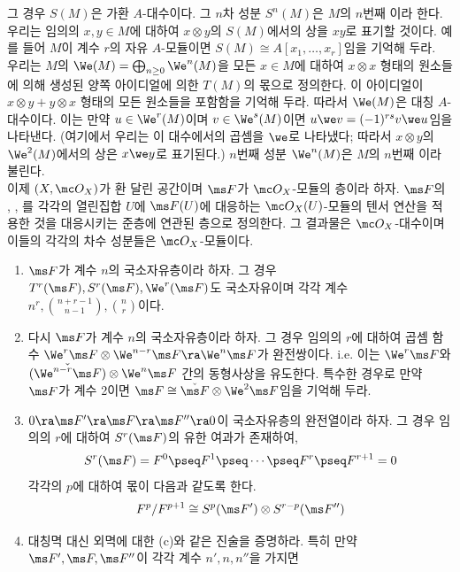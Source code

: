 \begin{enumerate}[label=\tb{5.\arabic*.},itemindent=0mm,itemsep=2mm]
	그 경우 $S(M)$은 가환 $A$-대수이다.
	그 $n$차 성분 $S^n(M)$은 $M$의 $n$번째 이라 한다.
	우리는 임의의 $x,y\in M$에 대하여 $x\otimes y$의 $S(M)$에서의 상을 $xy$로 표기할 것이다.
	예를 들어 $M$이 계수 $r$의 자유 $A$-모듈이면 $S(M)\cong A[x_1,\ldots,x_r]$임을 기억해 두라.\\
	우리는 $M$의  $\We(M)=\bigoplus_{n\ge 0}\We^n(M)$을
	모든 $x\in M$에 대하여 $x\otimes x$ 형태의 원소들에 의해 생성된 양쪽 아이디얼에 의한 $T(M)$의 몫으로 정의한다.
	이 아이디얼이 $x\otimes y+y\otimes x$ 형태의 모든 원소들을 포함함을 기억해 두라.
	따라서 $\We(M)$은  대칭 $A$-대수이다.
	이는 만약 $u\in\We^r(M)$이며 $v\in\We^s(M)$이면 $u\we v=(-1)^{rs}v\we u$임을 나타낸다.
	(여기에서 우리는 이 대수에서의 곱셈을 $\we$로 나타냈다; 따라서 $x\otimes y$의 $\We^2(M)$에서의 상은 $x\we y$로 표기된다.)
	$n$번째 성분 $\We^n(M)$은 $M$의 $n$번째 이라 불린다.\\
	이제 $(X,\mc O_X)$가 환 달린 공간이며 $\ms F$가 $\mc O_X$-모듈의 층이라 하자.
	$\ms F$의 , , 를
	각각의 열린집합 $U$에 $\ms F(U)$에 대응하는 $\mc O_X(U)$-모듈의 텐서 연산을 적용한 것을 대응시키는 준층에 연관된 층으로 정의한다.
	그 결과물은 $\mc O_X$-대수이며 이들의 각각의 차수 성분들은 $\mc O_X$-모듈이다.\\
	\begin{enumerate}[label=(\alph*)]
	\item $\ms F$가 계수 $n$의 국소자유층이라 하자. 그 경우 $T^r(\ms F),S^r(\ms F),\We^r(\ms F)$도 국소자유이며
	각각 계수 $n^r,\binom{n+r-1}{n-1},\binom nr$이다.
	\item 다시 $\ms F$가 계수 $n$의 국소자유층이라 하자. 그 경우 임의의 $r$에 대하여
	곱셈 함수 $\We^r\ms F\otimes\We^{n-r}\ms F\ra\We^n\ms F$가 완전쌍이다.
	i.e. 이는 $\We^r\ms F$와 $\check{(\We^{n-r}\ms F)}\otimes\We^n\ms F$ 간의 동형사상을 유도한다.
	특수한 경우로 만약 $\ms F$가 계수 2이면 $\ms F\cong\check{\ms F}\otimes\We^2\ms F$임을 기억해 두라.
	\item $0\ra\ms F'\ra\ms F\ra\ms F''\ra 0$이 국소자유층의 완전열이라 하자.
	그 경우 임의의 $r$에 대하여 $S^r(\ms F)$의 유한 여과가 존재하여,
	$$S^r(\ms F)=F^0\pseq F^1\pseq\cdots\pseq F^r\pseq F^{r+1}=0$$
	각각의 $p$에 대하여 몫이 다음과 같도록 한다.
	$$F^p/F^{p+1}\cong S^p(\ms F')\otimes S^{r-p}(\ms F'')$$
	\item 대칭멱 대신 외멱에 대한 (c)와 같은 진술을 증명하라.
	특히 만약 $\ms F',\ms F,\ms F''$이 각각 계수 $n',n,n''$을 가지면

\end{enumerate}
\end{enumerate}
